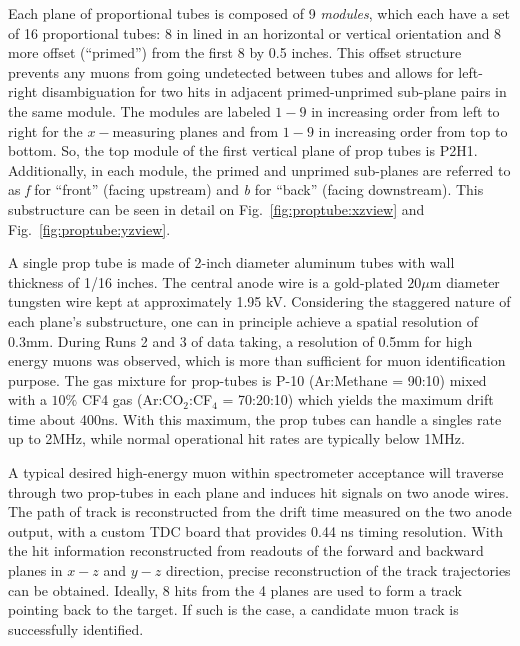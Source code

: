 Each plane of proportional tubes is composed of 9 \emph{modules}, which each have a set of 16 proportional tubes: 8 in lined in an horizontal or vertical orientation and 8 more offset (``primed'') from the first 8 by 0.5 inches. This offset structure prevents any muons from going undetected between tubes and allows for left-right disambiguation for two hits in adjacent primed-unprimed sub-plane pairs in the same module. The modules are labeled $1-9$ in increasing order from left to right for the $x-$measuring planes and from $1-9$ in increasing order from top to bottom. So, the top module of the first vertical plane of prop tubes is P2H1. Additionally, in each module, the primed and unprimed sub-planes are referred to as \emph{f} for ``front'' (facing upstream) and \emph{b} for ``back'' (facing downstream). This substructure can be seen in detail on Fig.~\ref{fig:proptube:xzview} and Fig.~\ref{fig:proptube:yzview}.

A single prop tube is made of 2-inch diameter aluminum tubes with wall thickness of 1/16 inches. The central anode wire is a gold-plated $20 \mu$m diameter tungsten wire kept at approximately 1.95 kV. Considering the staggered nature of each plane's substructure, one can in principle achieve a spatial resolution of 0.3mm.  During Runs 2 and 3 of data taking, a resolution of 0.5mm for high energy muons was observed, which is more than sufficient for muon identification purpose. The gas mixture for prop-tubes is P-10 (Ar:Methane = 90:10) mixed with a $10\%$ CF4 gas (Ar:CO$_2$:CF$_4$ = 70:20:10) which yields the maximum drift time about 400ns. With this maximum, the prop tubes can handle a singles rate up to 2MHz, while normal operational hit rates are typically below 1MHz.

A typical desired high-energy muon within spectrometer acceptance will traverse through two prop-tubes in each plane and induces hit signals on two anode wires. The path of track is reconstructed from the drift time measured on the two anode output, with a custom TDC board that provides 0.44 ns timing resolution. With the hit information reconstructed from readouts of the forward and backward planes in $x-z$ and $y-z$ direction, precise reconstruction of the track trajectories can be obtained. Ideally, 8 hits from the 4 planes are used to form a track pointing back to the target. If such is the case, a candidate muon track is successfully identified.

